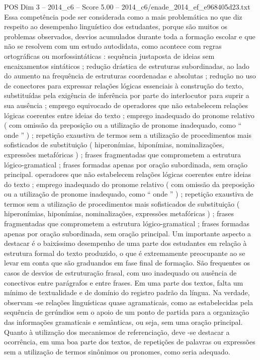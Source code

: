 \begin{textsample}{POS Dim 3 – 2014\_c6 – Score 5.00 – 2014\_c6/enade\_2014\_ef\_e968405d23.txt}
Essa competência pode ser considerada como a mais problemática no que diz respeito ao desempenho linguístico dos estudantes, porque são muitos os problemas observados, desvios acumulados durante toda a formação escolar e que não se resolvem com um estudo autodidata, como acontece com regras ortográficas ou morfossintáticas : sequência justaposta de ideias sem encaixamentos sintáticos ; redução drástica de estruturas subordinadas, ao lado do aumento na frequência de estruturas coordenadas e absolutas ; redução no uso de conectores para expressar relações lógicas essenciais à construção do texto, substituídas pela exigência de inferência por parte do interlocutor para suprir a sua ausência ; emprego equivocado de operadores que não estabelecem relações lógicas coerentes entre ideias do texto ; emprego inadequado do pronome relativo ( com omissão da preposição ou a utilização de pronome inadequado, como “ onde ” ) ; repetição exaustiva de termos sem a utilização de procedimentos mais sofisticados de substituição ( hiperonímias, hiponímias, nominalizações, expressões metafóricas ) ; frases fragmentadas que comprometem a estrutura lógico-gramatical ; frases formadas apenas por oração subordinada, sem oração principal. operadores que não estabelecem relações lógicas coerentes entre ideias do texto ; emprego inadequado do pronome relativo ( com omissão da preposição ou a utilização de pronome inadequado, como “ onde ” ) ; repetição exaustiva de termos sem a utilização de procedimentos mais sofisticados de substituição ( hiperonímias, hiponímias, nominalizações, expressões metafóricas ) ; frases fragmentadas que comprometem a estrutura lógico-gramatical ; frases formadas apenas por oração subordinada, sem oração principal.
Um importante aspecto a destacar é o baixíssimo desempenho de uma parte dos estudantes em relação à estrutura formal do texto produzido, o que é extremamente preocupante ao se levar em conta que são graduandos em fase final de formação.
São frequentes os casos de desvios de estruturação frasal, com uso inadequado ou ausência de conectivos entre parágrafos e entre frases.
Em uma parte dos textos, falta um mínimo de textualidade e de domínio do registro padrão da língua.
Na verdade, observam -se relações linguísticas quase agramaticais, como as estabelecidas pela sequência de gerúndios sem o apoio de um ponto de partida para a organização das informações gramaticais e semânticas, ou seja, sem uma oração principal.
Quanto à utilização dos mecanismos de referenciação, deve -se destacar a ocorrência, em uma boa parte dos textos, de repetições de palavras ou expressões sem a utilização de termos sinônimos ou pronomes, como seria adequado.

\end{textsample}
